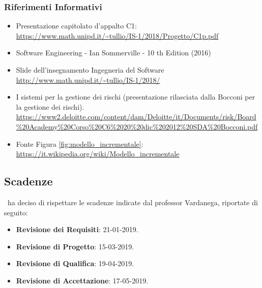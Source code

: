 		\subsubsection{Riferimenti Informativi}\label{rifinfo}
			\begin{itemize}
				\item Presentazione capitolato d'appalto C1:\\
				\url{https://www.math.unipd.it/~tullio/IS-1/2018/Progetto/C1p.pdf}
				\item Software Engineering - Ian Sommerville - 10 th Edition (2016)
				\item Slide dell’insegnamento Ingegneria del Software\\
				\url{http://www.math.unipd.it/~tullio/IS-1/2018/}
				\item I sistemi per la gestione dei rischi (presentazione rilasciata dalla Bocconi per la gestione dei rischi).\\
				\url{https://www2.deloitte.com/content/dam/Deloitte/it/Documents/risk/Board\%20Academy\%20Corso\%20C6\%2020\%20dic\%202012\%20SDA\%20Bocconi.pdf}
				\item Fonte Figura \ref{fig:modello_incrementale}:\\
				\url{https://it.wikipedia.org/wiki/Modello_incrementale}
			\end{itemize}
		
	\subsection{Scadenze}\label{Scadenze}
	\gruppo\ ha deciso di rispettare le scadenze indicate dal professor Vardanega, riportate di seguito:
	\begin{itemize}
		\item \textbf{Revisione dei Requisiti}: 21-01-2019.
		\item \textbf{Revisione di Progetto}: 15-03-2019.
		\item \textbf{Revisione di Qualifica}: 19-04-2019.
		\item \textbf{Revisione di Accettazione}: 17-05-2019.
	\end{itemize}
	
